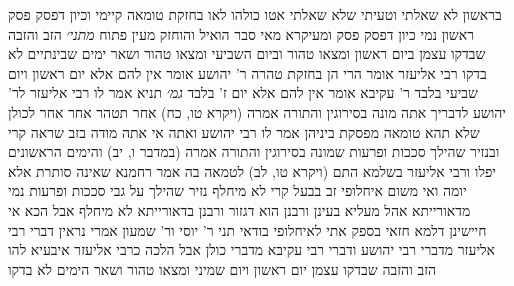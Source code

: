\documentclass[12pt, openany]{book}
\begin{document}
{בראשון לא שאלתי וטעיתי שלא שאלתי אטו כולהו לאו בחזקת טומאה קיימי וכיון דפסק פסק ראשון נמי כיון דפסק פסק 
ומעיקרא מאי סבר הואיל והוחזק מעין פתוח
{\large\emph{מתני׳}} הזב והזבה שבדקו עצמן ביום ראשון ומצאו טהור וביום השביעי ומצאו טהור ושאר ימים שבינתיים לא בדקו רבי אליעזר אומר הרי הן בחזקת טהרה ר' יהושע אומר אין להם אלא יום ראשון ויום שביעי בלבד ר' עקיבא אומר אין להם אלא יום ז' בלבד
{\large\emph{גמ׳}} תניא אמר לו רבי אליעזר לר' יהושע לדבריך אתה מונה בסירוגין והתורה אמרה (ויקרא טו, כח) אחר תטהר אחר אחר לכולן שלא תהא טומאה מפסקת ביניהן 
אמר לו רבי יהושע ואתה אי אתה מודה בזב שראה קרי ובנזיר שהילך סככות ופרעות שמונה בסירוגין והתורה אמרה (במדבר ו, יב) והימים הראשונים יפלו 
ורבי אליעזר בשלמא התם (ויקרא טו, לב) לטמאה בה אמר רחמנא שאינה סותרת אלא יומה ואי משום איחלופי זב בבעל קרי לא מיחלף 
נזיר שהילך על גבי סככות ופרעות נמי מדאורייתא אהל מעליא בעינן ורבנן הוא דגזור ורבנן בדאורייתא לא מיחלף 
אבל הכא אי חיישינן דלמא חזאי בספק אתי לאיחלופי בודאי 
תני ר' יוסי ור' שמעון אמרי נראין דברי רבי אליעזר מדברי רבי יהושע ודברי רבי עקיבא מדברי כולן אבל הלכה כרבי אליעזר
איבעיא להו הזב והזבה שבדקו עצמן יום ראשון ויום שמיני ומצאו טהור ושאר הימים לא בדקו}
\end{document}
